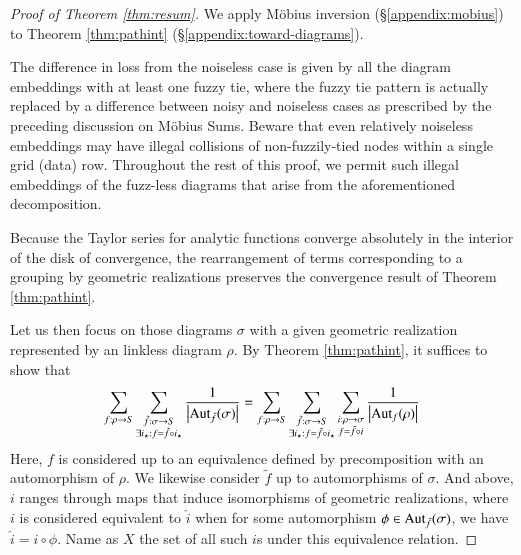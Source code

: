 \documentclass[anon,12pt]{colt2021} %
\newcommand{\wabs}[1]{\left|#1\right|}
\newcommand{\Aut}{\text{\textnormal{Aut}}}
\begin{document}
{        \begin{proof}[Proof of Theorem \ref{thm:resum}]
            We apply M\"obius inversion (\S\ref{appendix:mobius}) to Theorem
            \ref{thm:pathint} (\S\ref{appendix:toward-diagrams}).

            The difference in loss from the noiseless case is given by all the
            diagram embeddings with at least one fuzzy tie, where the fuzzy tie
            pattern is actually replaced by a difference between noisy and
            noiseless cases as prescribed by the preceding discussion on
            M\"obius Sums.  Beware that even relatively noiseless embeddings
            may have illegal collisions of non-fuzzily-tied nodes within a
            single grid (data) row.  Throughout the rest of this proof, we
            permit such illegal embeddings of the fuzz-less diagrams that arise
            from the aforementioned decomposition.  

            Because the Taylor series for analytic functions converge
            absolutely in the interior of the disk of convergence, the
            rearrangement of terms corresponding to a grouping by geometric
            realizations preserves the convergence result of Theorem
            \ref{thm:pathint}.  

            Let us then focus on those diagrams $\sigma$ with a given geometric
            realization represented by an linkless diagram $\rho$.  By
            Theorem \ref{thm:pathint}, it suffices to show that
            \begin{equation} \label{eq:hard}
                \sum_{f:\rho\to S}
                \sum_{\substack{
                    \tilde f:\sigma\to S \\
                    \exists i_\star: f=\tilde f \circ i_\star
                }}
                \frac{1}{\wabs{\Aut_{\tilde f}(\sigma)}}
                =
                \sum_{f:\rho\to S}
                \sum_{\substack{
                    \tilde f:\sigma\to S \\
                    \exists i_\star: f=\tilde f \circ i_\star
                }}
                \sum_{\substack{
                    i:\rho\to\sigma \\
                    f = \tilde f \circ i
                }}
                \frac{1}{\wabs{\Aut_{f}(\rho)}}
            \end{equation}
            Here, $f$ is considered up to an equivalence defined by
            precomposition with an automorphism of $\rho$.  We likewise
            consider $\tilde f$ up to automorphisms of $\sigma$.  And above,
            $i$ ranges through maps that induce isomorphisms of geometric
            realizations, where $i$ is considered equivalent to $\hat i$ when
            for some automorphism $\phi \in \Aut_{\tilde f}(\sigma)$, we have
            $\hat i = i \circ \phi$.  Name as $X$ the set of all such $i$s
            under this equivalence relation.


\end{proof}}
\end{document}
